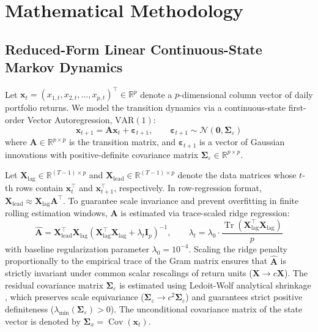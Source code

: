 \documentclass[review,12pt,authoryear]{elsarticle}
\begin{document}
\section{Mathematical Methodology}
\label{sec:methodology}

\subsection{Reduced-Form Linear Continuous-State Markov Dynamics}
Let $\mathbf{x}_t = (x_{1,t}, x_{2,t}, \dots, x_{p,t})^\top \in \mathbb{R}^p$ denote a $p$-dimensional column vector of daily portfolio returns. We model the transition dynamics via a continuous-state first-order Vector Autoregression, $\text{VAR}(1)$:
\begin{equation}
\mathbf{x}_{t+1} = \mathbf{A}\mathbf{x}_t + \boldsymbol{\varepsilon}_{t+1}, \qquad \boldsymbol{\varepsilon}_{t+1} \sim \mathcal{N}(\mathbf{0}, \boldsymbol{\Sigma}_\varepsilon)
\label{eq:var1_model}
\end{equation}
where $\mathbf{A} \in \mathbb{R}^{p \times p}$ is the transition matrix, and $\boldsymbol{\varepsilon}_{t+1}$ is a vector of Gaussian innovations with positive-definite covariance matrix $\boldsymbol{\Sigma}_\varepsilon \in \mathbb{R}^{p \times p}$. 

Let $\mathbf{X}_{\text{lag}} \in \mathbb{R}^{(T-1) \times p}$ and $\mathbf{X}_{\text{lead}} \in \mathbb{R}^{(T-1) \times p}$ denote the data matrices whose $t$-th rows contain $\mathbf{x}_t^\top$ and $\mathbf{x}_{t+1}^\top$, respectively. In row-regression format, $\mathbf{X}_{\text{lead}} \approx \mathbf{X}_{\text{lag}}\mathbf{A}^\top$. To guarantee scale invariance and prevent overfitting in finite rolling estimation windows, $\mathbf{A}$ is estimated via trace-scaled ridge regression:
\begin{equation}
\hat{\mathbf{A}} = \mathbf{X}_{\text{lead}}^\top \mathbf{X}_{\text{lag}} \left( \mathbf{X}_{\text{lag}}^\top \mathbf{X}_{\text{lag}} + \lambda_t \mathbf{I}_p \right)^{-1}, \qquad \lambda_t = \lambda_0 \cdot \frac{\operatorname{Tr}(\mathbf{X}_{\text{lag}}^\top \mathbf{X}_{\text{lag}})}{p}
\label{eq:scaled_ridge}
\end{equation}
with baseline regularization parameter $\lambda_0 = 10^{-4}$. Scaling the ridge penalty proportionally to the empirical trace of the Gram matrix ensures that $\hat{\mathbf{A}}$ is strictly invariant under common scalar rescalings of return units ($\mathbf{X} \to c\mathbf{X}$). The residual covariance matrix $\boldsymbol{\Sigma}_\varepsilon$ is estimated using Ledoit-Wolf analytical shrinkage \citep{ledoit2004well}, which preserves scale equivariance ($\boldsymbol{\Sigma}_\varepsilon \to c^2 \boldsymbol{\Sigma}_\varepsilon$) and guarantees strict positive definiteness ($\lambda_{\min}(\boldsymbol{\Sigma}_\varepsilon) > 0$). The unconditional covariance matrix of the state vector is denoted by $\boldsymbol{\Sigma}_x = \operatorname{Cov}(\mathbf{x}_t)$.
\end{document}
